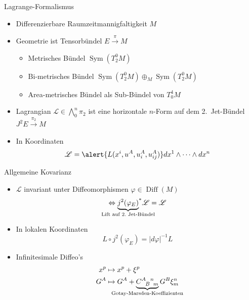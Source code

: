 \documentclass{beamer}
\newcommand{\gmc}[4]{\ensuremath{C^{#1\hphantom{#2}#3}_{\hphantom{#1}{#2}\hphantom{#3}#4}}}
\begin{document}
    \begin{frame}{Lagrange-Formalismus}
        \begin{itemize}
            \item Differenzierbare Raumzeitmannigfaltigkeit $M$
            \item Geometrie ist Tensorbündel $E \xrightarrow{\pi} M$
            \begin{itemize}
                \item Metrisches Bündel $\operatorname{Sym}(T^0_2 M)$
                \item Bi-metrisches Bündel $\operatorname{Sym}(T^0_2 M) \oplus_M \operatorname{Sym}(T^0_2 M)$
                \item Area-metrisches Bündel als Sub-Bündel von $T^4_0 M$
            \end{itemize}
            \item Lagrangian $\mathscr L \in \bigwedge^n_0 \pi_2$ ist eine horizontale $n$-Form auf dem
            2.\ Jet-Bündel $J^2 E \xrightarrow{\pi_2} M$
            \item In Koordinaten
            \[ \mathscr{L} = \alert{L(x^i, u^A, u^A_i, u^A_{ij})} dx^1 \wedge \dots \wedge dx^n \]
        \end{itemize}
    \end{frame}

    \begin{frame}{Allgemeine Kovarianz}
        \begin{itemize}
            \item $\mathscr L$ invariant unter Diffeomorphismen $\varphi\in\operatorname{Diff}(M)$
            \[ \Leftrightarrow {\underbrace{j^2(\varphi_E)}_{\mathclap{\text{Lift auf 2.\ Jet-Bündel}}}}^\ast\mathscr{L} = \mathscr{L} \]
            \item In lokalen Koordinaten
            \[ L\circ j^2(\varphi_E) = \lvert d\varphi\rvert^{-1} L \]
            \item Infinitesimale Diffeo's
            \begin{align*}
                x^p &\mapsto x^p + \xi^p \\
                G^A &\mapsto G^A + \underbrace{\gmc{A}{B}{n}{m}}_{\mathclap{\text{Gotay-Marsden-Koeffizienten}}} G^B \xi^n_m
            \end{align*}
        \end{itemize}
    \end{frame}
\end{document}
